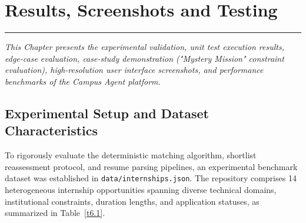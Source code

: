 \chapter{Results, Screenshots and Testing}
\label{C6} %
\graphicspath{{images/}{Figures/}}
\noindent\rule{\linewidth}{2pt}
\textit{This Chapter presents the experimental validation, unit test execution results, edge-case evaluation, case-study demonstration ("Mystery Mission" constraint evaluation), high-resolution user interface screenshots, and performance benchmarks of the Campus Agent platform.}
\section{Experimental Setup and Dataset Characteristics} \label{S6.1}
To rigorously evaluate the deterministic matching algorithm, shortlist reassessment protocol, and resume parsing pipelines, an experimental benchmark dataset was established in \texttt{data/internships.json}. The repository comprises 14 heterogeneous internship opportunities spanning diverse technical domains, institutional constraints, duration lengths, and application statuses, as summarized in Table~\ref{t6.1}.

